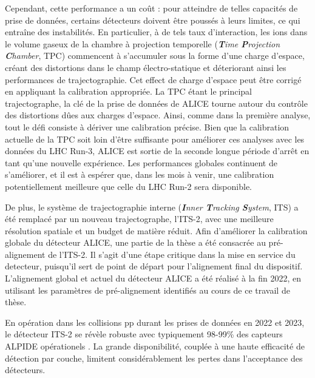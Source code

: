 Cependant, cette performance a un coût : pour atteindre de telles capacités de prise de données, certains détecteurs doivent être poussés à leurs limites, ce qui entraîne des instabilités. En particulier, à de tels taux d'interaction, les ions dans le volume gaseux de la chambre à projection temporelle (\textit{{\bf T}ime {\bf P}rojection {\bf C}hamber}, TPC) commencent à s'accumuler sous la forme d'une charge d'espace, créant des distortions dans le champ électro-statique et déteriorant ainsi les performances de trajectographie. Cet effect de charge d'espace peut être corrigé en appliquant la calibration appropriée. La TPC étant le principal trajectographe, la clé de la prise de données de ALICE tourne autour du contrôle des distortions dûes aux charges d'espace. Ainsi, comme dans la première analyse, tout le défi consiste à dériver une calibration précise. Bien que la calibration actuelle de la TPC soit loin d'être suffisante pour améliorer ces analyses avec les données du LHC Run-3, ALICE est sortie de la seconde longue période d'arrêt en tant qu'une nouvelle expérience. Les performances globales continuent de s'améliorer, et il est à espérer que, dans les mois à venir, une calibration potentiellement meilleure que celle du LHC Run-2 sera disponible. 

De plus, le système de trajectographie interne (\textit{{\bf I}nner {\bf T}racking {\bf S}ystem}, ITS) a été remplacé par un nouveau trajectographe, l'ITS-2, avec une meilleure résolution spatiale et un budget de matière réduit. Afin d'améliorer la calibration globale du détecteur ALICE, une partie de la thèse a été consacrée au pré-alignement de l'ITS-2. Il s'agit d'une étape critique dans la mise en service du detecteur, puisqu'il sert de point de départ pour l'alignement final du dispositif. L'alignement global et actuel du détecteur ALICE a été réalisé à la fin 2022, en utilisant les paramètres de pré-alignement identifiés au cours de ce travail de thèse.

En opération dans les collisions pp durant les prises de données en 2022 et 2023, le détecteur ITS-2 se révèle robuste avec typiquement 98-99\% des capteurs ALPIDE opérationels \cite{alicecollaborationALICEUpgradesLHC2023}. La grande disponibilité, couplée à une haute efficacité de détection par couche, limitent considérablement les pertes dans l'acceptance des détecteurs.\\

